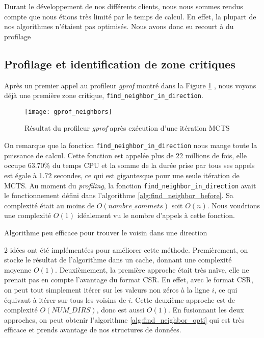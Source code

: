 Durant le développement de nos différents clients, nous nous sommes rendus
compte que nous étions très limité par le temps de calcul. En effet,
la plupart de nos algorithmes n'étaient pas optimisés. Nous avons donc
eu recourt à du profilage

\subsection{Profilage et identification de zone critiques}
Après un premier appel au profileur \textit{gprof} montré dans la Figure \ref{fig:gprof-find-neighbors}
, nous voyons déjà une première zone critique, \verb|find_neighbor_in_direction|.

\begin{figure}[H]
	\texttt{[image: gprof\_neighbors]}
	\caption{Résultat du profileur \textit{gprof} après exécution d'une itération MCTS}
	\label{fig:gprof-find-neighbors}
\end{figure}

On remarque que la fonction \verb|find_neighbor_in_direction| nous mange
toute la puissance de calcul. Cette fonction est appelée plus de 22 millions de fois, elle 
occupe 63.70\% du temps CPU et la somme de la durée prise par tous ses appels est égale à 1.72 secondes, ce qui est gigantesque
pour une seule itération de MCTS. Au moment du \textit{profiling}, la fonction \verb|find_neighbor_in_direction| avait le fonctionnement défini
dans l'algorithme \ref{alg:find_neighbor_before}. Sa complexité était au moins de $O(nombre\_sommets)$ soit $O(n)$. Nous voudrions une complexité
$O(1)$ idéalement vu le nombre d'appels à cette fonction.

\begin{algorithm}
	\caption{Algorithme peu efficace pour trouver le voisin dans une direction}
	\label{alg:find_neighbor_before}
\end{algorithm}

2 idées ont été implémentées pour améliorer cette méthode. Premièrement, on stocke le résultat
de l'algorithme dans un cache, donnant une complexité moyenne $O(1)$. Deuxièmement, la première approche
était très naïve, elle ne prenait pas en compte l'avantage du format CSR. En effet, avec le format CSR,
on peut tout simplement itérer sur les valeurs non zéros à la ligne $i$, ce qui équivaut à itérer sur tous
les voisins de $i$. Cette deuxième approche est de complexité $O(NUM\_DIRS)$, donc est aussi $O(1)$.
En fusionnant les deux approches, on peut obtenir l'algorithme \ref{alg:find_neighbor_opti} qui est très efficace
et prends avantage de nos structures de données.

